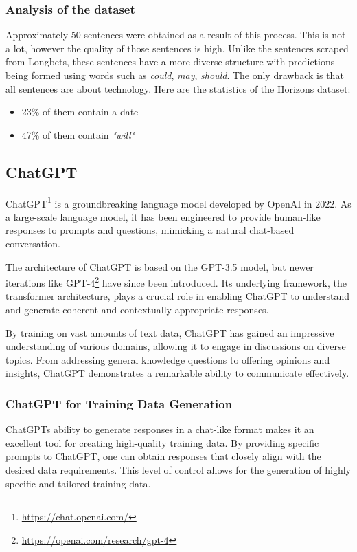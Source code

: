 \documentclass[12pt,oneside,bibtotoc,liststotoc]{scrbook}
\begin{document}
\subsubsection{Analysis of the dataset}
Approximately 50 sentences were obtained as a result of this process. This is not a lot, however the quality of those sentences is high. Unlike the sentences scraped from Longbets, these sentences have a more diverse structure with predictions being formed using words such as \textit{could}, \textit{may}, \textit{should}. The only drawback is that all sentences are about technology. Here are the statistics of the Horizons dataset:

\begin{itemize}
  \item 23\% of them contain a date
  \item 47\% of them contain \textit{"will"}
\end{itemize}


\subsection{ChatGPT} %
ChatGPT\footnote{\url{https://chat.openai.com/}} is a groundbreaking language model developed by OpenAI in 2022. As a large-scale language model, it has been engineered to provide human-like responses to prompts and questions, mimicking a natural chat-based conversation.

The architecture of ChatGPT is based on the GPT-3.5 model, but newer iterations like GPT-4\footnote{\url{https://openai.com/research/gpt-4}} have since been introduced. Its underlying framework, the transformer architecture, plays a crucial role in enabling ChatGPT to understand and generate coherent and contextually appropriate responses.

By training on vast amounts of text data, ChatGPT has gained an impressive understanding of various domains, allowing it to engage in discussions on diverse topics. From addressing general knowledge questions to offering opinions and insights, ChatGPT demonstrates a remarkable ability to communicate effectively. \cite{OpenAIChatGPT}

\subsubsection{ChatGPT for Training Data Generation}
ChatGPTs ability to generate responses in a chat-like format makes it an excellent tool for creating high-quality training data. By providing specific prompts to ChatGPT, one can obtain responses that closely align with the desired data requirements. This level of control allows for the generation of highly specific and tailored training data.
\end{document}
